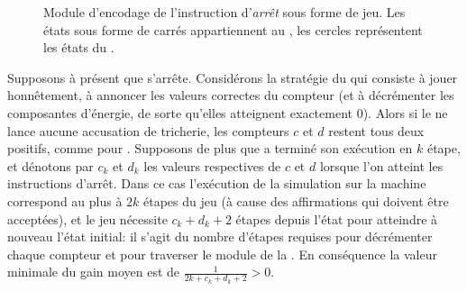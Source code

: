 \begin{figure}[ht]
\centering
{}
\caption[Module d'encodage de l'instruction d'\textit{arrêt} sous forme de jeu]{Module d'encodage de l'instruction d'\textit{arrêt} sous forme de jeu. Les états sous forme de carrés appartiennent au \jo, les cercles représentent les états du \ji.}%
\label{tj:fig:halt}
\end{figure}

Supposons à présent que \machine s'arrête.
Considérons la stratégie du \jo qui consiste à jouer honnêtement, \cad à annoncer les valeurs correctes du compteur (et à décrémenter les composantes d'énergie, de sorte qu'elles atteignent exactement $0$).
Alors si le \ji ne lance aucune accusation de tricherie, les compteurs $c$ et $d$ restent tous deux positifs, comme pour \machine.
Supposons de plus que \machine a terminé son exécution en $k$ étape, et dénotons par $c_k$ et $d_k$ les valeurs respectives de $c$ et $d$ lorsque l'on atteint les instructions d'arrêt.
Dans ce cas l'exécution de la simulation sur la machine correspond au plus à $2k$ étapes du jeu (à cause des affirmations qui doivent être acceptées), et le jeu nécessite $c_k+d_k+2$ étapes depuis l'état \tjhalt pour atteindre à nouveau l'état initial: il s'agit du nombre d'étapes requises pour décrémenter chaque compteur et pour traverser le module de la .
En conséquence la valeur minimale du gain moyen est de $\frac1{2k+c_k+d_k+2}>0$.

